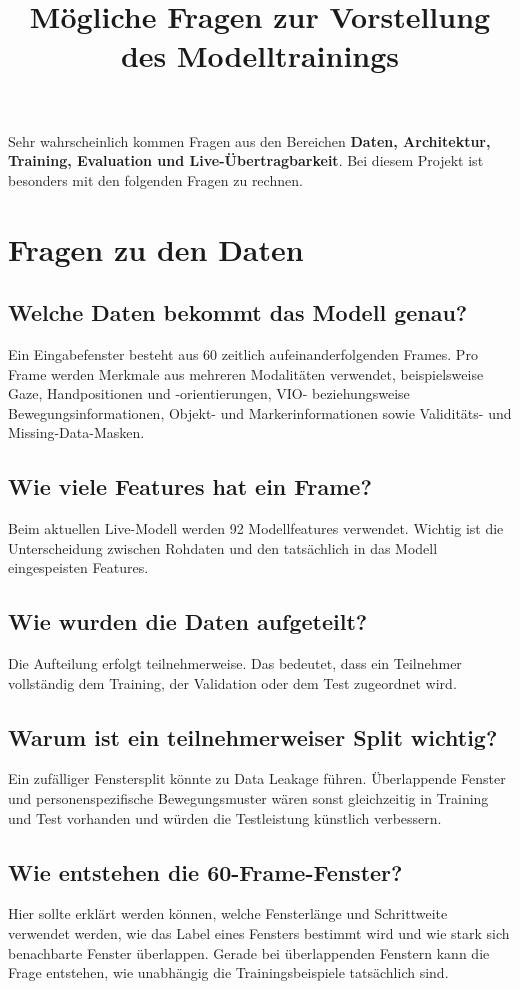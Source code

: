 \documentclass[11pt,a4paper]{article}
\title{Mögliche Fragen zur Vorstellung des Modelltrainings}
\author{}
\date{}
\begin{document}
\maketitle

Sehr wahrscheinlich kommen Fragen aus den Bereichen \textbf{Daten, Architektur, Training, Evaluation und Live-Übertragbarkeit}. Bei diesem Projekt ist besonders mit den folgenden Fragen zu rechnen.

\section{Fragen zu den Daten}

\subsection*{Welche Daten bekommt das Modell genau?}
Ein Eingabefenster besteht aus 60 zeitlich aufeinanderfolgenden Frames. Pro Frame werden Merkmale aus mehreren Modalitäten verwendet, beispielsweise Gaze, Handpositionen und -orientierungen, VIO- beziehungsweise Bewegungsinformationen, Objekt- und Markerinformationen sowie Validitäts- und Missing-Data-Masken.

\subsection*{Wie viele Features hat ein Frame?}
Beim aktuellen Live-Modell werden 92 Modellfeatures verwendet. Wichtig ist die Unterscheidung zwischen Rohdaten und den tatsächlich in das Modell eingespeisten Features.

\subsection*{Wie wurden die Daten aufgeteilt?}
Die Aufteilung erfolgt teilnehmerweise. Das bedeutet, dass ein Teilnehmer vollständig dem Training, der Validation oder dem Test zugeordnet wird.

\subsection*{Warum ist ein teilnehmerweiser Split wichtig?}
Ein zufälliger Fenstersplit könnte zu Data Leakage führen. Überlappende Fenster und personenspezifische Bewegungsmuster wären sonst gleichzeitig in Training und Test vorhanden und würden die Testleistung künstlich verbessern.

\subsection*{Wie entstehen die 60-Frame-Fenster?}
Hier sollte erklärt werden können, welche Fensterlänge und Schrittweite verwendet werden, wie das Label eines Fensters bestimmt wird und wie stark sich benachbarte Fenster überlappen. Gerade bei überlappenden Fenstern kann die Frage entstehen, wie unabhängig die Trainingsbeispiele tatsächlich sind.
\end{document}
